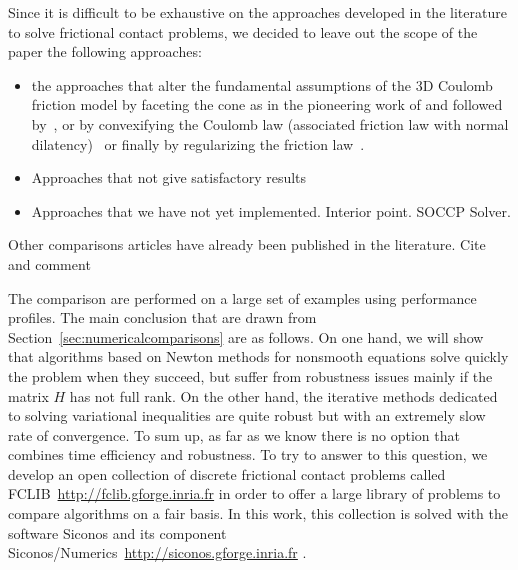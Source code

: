 Since it is difficult to be exhaustive on the approaches developed in the literature to solve frictional contact problems, we decided to leave out the scope of the paper the following approaches:
\begin{itemize}
\item the approaches that alter the fundamental assumptions of the 3D Coulomb friction model by faceting the cone as in the pioneering work of \cite{Klarbring1986} and followed by~\cite{AlFahed.Stavroulakis.ea1991,Pang.Trinkle1996,Stewart.Trinkle1996,Anitescu.Potra97,Haslinger.ea_JCAM2004}, or by convexifying the Coulomb law (associated friction law with normal dilatency)~\cite{Heyn.ea_IJNME2013,Tasora.Anistescu_Meccanica2013,Tasora.Anistescu_CMAME2011,Anistescu.Tasora_COA2010,Tasora.Anistescu_CMAME2009} or finally by regularizing the friction law~\cite{Kikuchi.Oden_SIAM1988}.
\item Approaches that not give satisfactory results
\item Approaches that we have not yet implemented. Interior point. SOCCP Solver.
\end{itemize}

Other comparisons articles have already been published in the literature. Cite and comment

\begin{list}{}{}
\item \cite{Raous.ea1988,Chabrand.ea_MCM1998}
\item \cite{Christensen.Klarbring.ea1998}
\item \cite{Mijar.Arora_SMO2000,Mijar.Arora_ACME2000,Mirar.Arora_SMO2004-I,Mirar.Arora_SMO2004-II}
\end{list}


The comparison are performed on a large set of examples using performance profiles. The main conclusion that are drawn from Section~\ref{sec:numericalcomparisons} are as follows.
On one hand, we will show that algorithms based on Newton methods for nonsmooth equations solve quickly the problem when they succeed, but suffer from robustness issues mainly if the matrix $H$ has not full rank. On the other hand, the
iterative methods dedicated to solving variational inequalities are quite robust but with an extremely slow rate of convergence. To sum up, as far as we know there is no option that combines time efficiency and robustness. To try to answer to this question, we develop an open collection of discrete frictional contact problems called FCLIB~\url{http://fclib.gforge.inria.fr} in order to offer a large library of problems to compare algorithms on a fair basis.  In this work, this collection is solved with the software {\sc Siconos} and its component {\sc Siconos/Numerics}~\url{http://siconos.gforge.inria.fr} .


